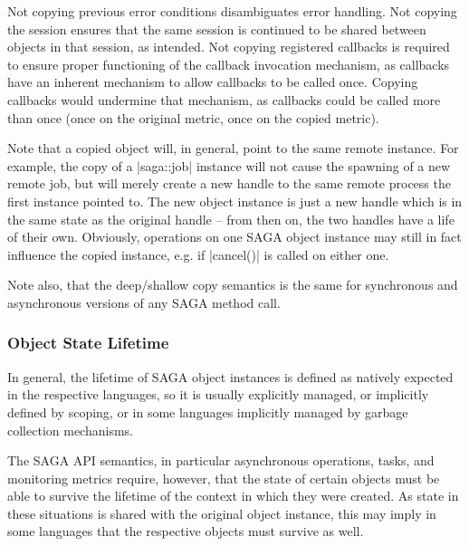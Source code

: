    Not copying previous error conditions disambiguates error
   handling.  Not copying the session ensures that the same
   session is continued to be shared between objects in that
   session, as intended.  Not copying registered callbacks is
   required to ensure proper functioning of the callback
   invocation mechanism, as callbacks have an inherent mechanism
   to allow callbacks to be called  once.  Copying
   callbacks would undermine that mechanism, as callbacks could
   be called more than once (once on the original metric, once
   on the copied metric). 
   
   Note that a copied object will, in general, point to the same
   remote instance.  For example, the copy of a |saga::job|
   instance will not cause the spawning of a new remote job, but
   will merely create a new handle to the same remote process
   the first instance pointed to.  The new object instance is
   just a new handle which is in the same state as the original
   handle -- from then on, the two handles have a life of their
   own.  Obviously, operations on one SAGA object instance may
   still in fact influence the copied instance, e.g. if
   |cancel()| is called on either one.

   Note also, that the deep/shallow copy semantics is the same
   for synchronous and asynchronous versions of any SAGA method
   call.  



  \subsubsection{Object State Lifetime}
   \label{ssec:lifetime}

   In general, the lifetime of SAGA object instances is defined
   as natively expected in the respective languages, so
   it is usually explicitly managed, or implicitly
   defined by scoping, or in some languages implicitly managed
   by garbage collection mechanisms.

   The SAGA API semantics, in particular asynchronous
   operations, tasks, and monitoring metrics require, however,
   that the state of certain objects must be able to survive the
   lifetime of the context in which they were created.
   As state in these situations is shared with the original
   object instance, this may imply in some languages that the
   respective objects must survive as well.

